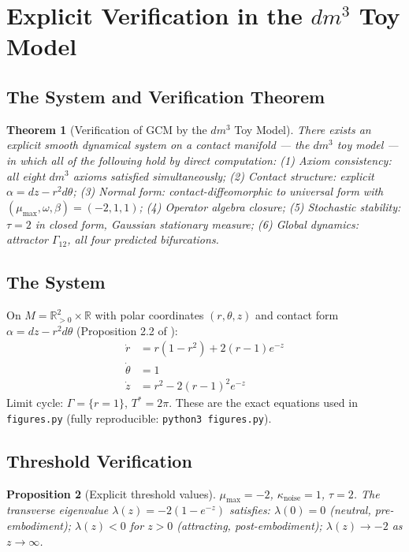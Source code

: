 \documentclass[11pt]{article}
\theoremstyle{boxed}
\newtheorem{theorem}{Theorem}[section]
\newtheorem{proposition}[theorem]{Proposition}
\begin{document}
\section{Explicit Verification in the $dm^3$ Toy Model}

\subsection{The System and Verification Theorem}

\begin{theorem}[Verification of GCM by the $dm^3$ Toy Model]
There exists an explicit smooth dynamical system on a contact manifold --- the $dm^3$
toy model --- in which all of the following hold by direct computation:
(1) Axiom consistency: all eight $dm^3$ axioms satisfied simultaneously;
(2) Contact structure: explicit $\alpha = dz - r^{2}d\theta$;
(3) Normal form: contact-diffeomorphic to universal form with $(\mu_{\max}, \omega, \beta) = (-2, 1, 1)$;
(4) Operator algebra closure;
(5) Stochastic stability: $\tau = 2$ in closed form, Gaussian stationary measure;
(6) Global dynamics: attractor $\Gamma_{12}$, all four predicted bifurcations.
\end{theorem}

\subsection{The System}

On $M = \mathbb{R}^{2}_{>0} \times \mathbb{R}$ with polar coordinates $(r, \theta, z)$
and contact form $\alpha = dz - r^{2}d\theta$ (Proposition 2.2 of \cite{dm3}):
\begin{align}
\dot{r} &= r(1 - r^{2}) + 2(r - 1)e^{-z} \label{eq:r}\\
\dot{\theta} &= 1 \label{eq:theta}\\
\dot{z} &= r^{2} - 2(r - 1)^{2}e^{-z} \label{eq:z}
\end{align}
Limit cycle: $\Gamma = \{r = 1\}$, $T^{*} = 2\pi$. These are the exact equations used in
\texttt{figures.py} (fully reproducible: \texttt{python3 figures.py}).

\subsection{Threshold Verification}

\begin{proposition}[Explicit threshold values]
$\mu_{\max} = -2$, $\kappa_{\mathrm{noise}} = 1$, $\tau = 2$. The transverse
eigenvalue $\lambda(z) = -2(1 - e^{-z})$ satisfies: $\lambda(0) = 0$ (neutral,
pre-embodiment); $\lambda(z) < 0$ for $z > 0$ (attracting, post-embodiment);
$\lambda(z) \to -2$ as $z \to \infty$.
\end{proposition}
\end{document}

